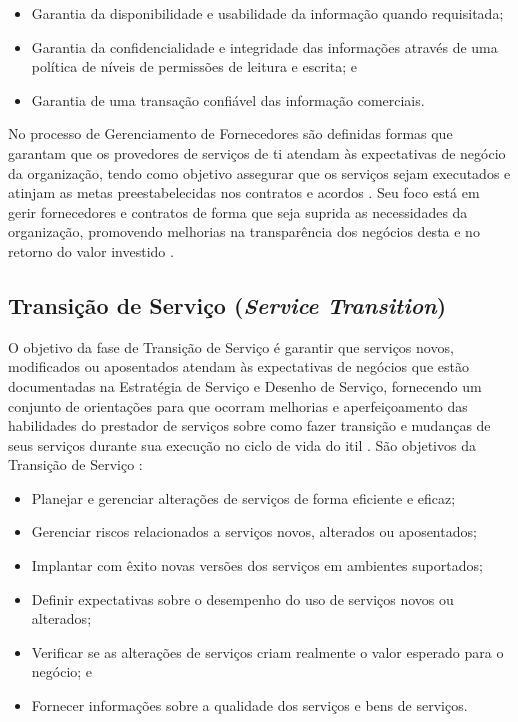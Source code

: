 \begin{itemize}
    \item Garantia da disponibilidade e usabilidade da informação quando requisitada;
    \item Garantia da confidencialidade e integridade das informações através de uma política de níveis de permissões de leitura e escrita; e
    \item Garantia de uma transação confiável das informação comerciais.
\end{itemize}

No processo de Gerenciamento de Fornecedores são definidas formas que garantam que os provedores de serviços de \acrshort{ti} atendam às expectativas de negócio da organização, tendo como objetivo assegurar que os serviços sejam executados e atinjam as metas preestabelecidas nos contratos e acordos \cite{introductoryoverviewofitil}. Seu foco está em gerir fornecedores e contratos de forma que seja suprida as necessidades da organização, promovendo melhorias na transparência dos negócios desta e no retorno do valor investido \cite{abreu2012implantando}.

\subsection*{Transição de Serviço (\textit{Service Transition})}

\noindent O objetivo da fase de Transição de Serviço é garantir que serviços novos, modificados ou aposentados atendam às expectativas de negócios que estão documentadas na Estratégia de Serviço e Desenho de Serviço, fornecendo um conjunto de orientações para que ocorram melhorias e aperfeiçoamento das habilidades do prestador de serviços sobre como fazer transição e mudanças de seus serviços durante sua execução no ciclo de vida do \acrshort{itil} \cite{servicetransiction, itilimplementationfailure}. São objetivos da Transição de Serviço \cite{servicetransiction}:

\begin{itemize}
    \item Planejar e gerenciar alterações de serviços de forma eficiente e eficaz;
    \item Gerenciar riscos relacionados a serviços novos, alterados ou aposentados;
    \item Implantar com êxito novas versões dos serviços em ambientes suportados;
    \item Definir expectativas sobre o desempenho do uso de serviços novos ou alterados;
    \item Verificar se as alterações de serviços criam realmente o valor esperado para o negócio; e
    \item Fornecer informações sobre a qualidade dos serviços e bens de serviços.
\end{itemize}


